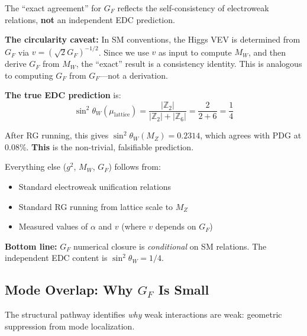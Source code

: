 \begin{remark}
\label{rem:ch11_firewall}
The ``exact agreement'' for $G_F$ reflects the self-consistency of electroweak
relations, \textbf{not} an independent EDC prediction.

\textbf{The circularity caveat:} In SM conventions, the Higgs VEV is determined
from $G_F$ via $v = (\sqrt{2}G_F)^{-1/2}$. Since we use $v$ as input to compute
$M_W$, and then derive $G_F$ from $M_W$, the ``exact'' result is a consistency
identity. This is analogous to computing $G_F$ from $G_F$---not a derivation.

\textbf{The true EDC prediction} is:
\begin{equation}
    \sin^2\theta_W(\mu_{\text{lattice}}) = \frac{|\mathbb{Z}_2|}{|\mathbb{Z}_2| + |\mathbb{Z}_6|}
    = \frac{2}{2+6} = \frac{1}{4}
    \label{eq:ch11_sin2_input}
\end{equation}

After RG running, this gives $\sin^2\theta_W(M_Z) = 0.2314$, which agrees with
PDG at 0.08\%. \textbf{This} is the non-trivial, falsifiable prediction.

Everything else ($g^2$, $M_W$, $G_F$) follows from:
\begin{itemize}[nosep]
    \item Standard electroweak unification relations \tagBL{}
    \item Standard RG running from lattice scale to $M_Z$ \tagBL{}
    \item Measured values of $\alpha$ and $v$ (where $v$ depends on $G_F$) \tagBL{}
\end{itemize}

\textbf{Bottom line:} $G_F$ numerical closure is \emph{conditional} on SM
relations. The independent EDC content is $\sin^2\theta_W = 1/4$.
\end{remark}

\subsection{\texorpdfstring{Mode Overlap: Why $G_F$ Is Small}{Mode Overlap: Why GF Is Small}}
\label{sec:ch11_overlap}

The structural pathway identifies \emph{why} weak interactions are weak:
geometric suppression from mode localization.

